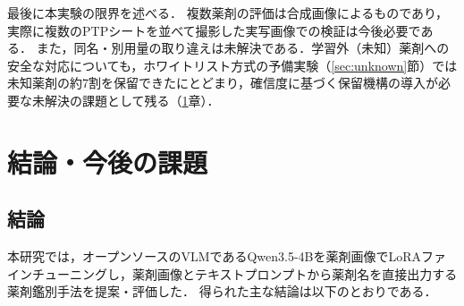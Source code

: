 \documentclass[dvipdfmx]{jsarticle}
\begin{document}
最後に本実験の限界を述べる．
複数薬剤の評価は合成画像によるものであり，実際に複数のPTPシートを並べて撮影した実写画像での検証は今後必要である．
また，同名・別用量の取り違えは未解決である．学習外（未知）薬剤への安全な対応についても，ホワイトリスト方式の予備実験（\ref{sec:unknown}節）では未知薬剤の約7割を保留できたにとどまり，確信度に基づく保留機構の導入が必要な未解決の課題として残る（\ref{sec5}章）．

\newpage

\section{結論・今後の課題}\label{sec5}

\subsection{結論}

本研究では，オープンソースのVLMであるQwen3.5-4Bを薬剤画像でLoRAファインチューニングし，薬剤画像とテキストプロンプトから薬剤名を直接出力する薬剤鑑別手法を提案・評価した．
得られた主な結論は以下のとおりである．
\end{document}
